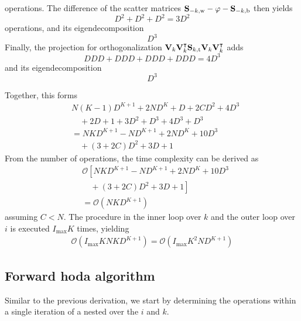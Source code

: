 operations.
The difference of the scatter matrices
$\mathbf{S}_{-k, \text{w}} - \varphi - \mathbf{S}_{-k,\text{b}}$
then yields
\begin{equation}
	D^2 + D^2 + D^2 = 3D^2
\end{equation}
operations,
and its eigendecomposition
\begin{equation}
	D^3
\end{equation}
Finally,  the projection for orthogonalization
$\mathbf{V}_k\mathbf{V}_k^\intercal\mathbf{S}_{k,\text{t}}\mathbf{V}_k\mathbf{V}_k^\intercal$
adds
\begin{equation}
	DDD + DDD + DDD +DDD = 4D^3
\end{equation}
and its eigendecomposition
\begin{equation}
	D^3
\end{equation}

Together, this forms
\begin{equation}
	\begin{split}
		& N(K-1)D^{K+1} + 2ND^K + D + 2CD^2 + 4D^3 \\
		& \quad + 2D +1 +3D^2 + D^3 + 4D^3 + D^3 \\
		& = NKD^{K+1} -ND^{K+1} + 2ND^K + 10D^3 \\
		& \quad +(3+2C)D^2 + 3D+1
	\end{split}
\end{equation}
From the number of operations, the time complexity can be derived as
\begin{equation}
	\begin{split}
		& \mathcal{O}\left[ NKD^{K+1} -ND^{K+1} + 2ND^K + 10D^3\right. \\
		& \left. \quad +(3+2C)D^2 + 3D+1 \right] \\
		& = \mathcal{O}\left(NKD^{K+1} \right)
	\end{split}
\end{equation}
assuming $C < N$.
The procedure in the inner loop over $k$ and the outer loop over $i$ is
executed $I_\text{max}K$ times, yielding
\begin{equation}
	\begin{split}
		\mathcal{O}\left(I_\text{max}KNKD^{K+1}\right)
		= \mathcal{O}\left(I_\text{max}K^2ND^{K+1}\right)
	\end{split}
	\label{eq:complexity/backward}
\end{equation}

\subsection{Forward \ac{hoda} algorithm}
Similar to the previous derivation, we start by determining the operations
within a single iteration of a nested over the $i$ and $k$.

